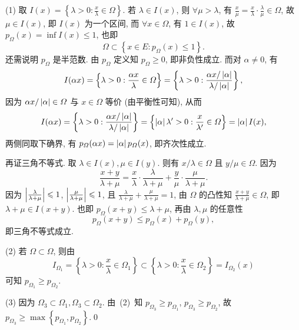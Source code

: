	\begin{Proof}
		(1) 取 $ I(x)=\left\{ \lambda>0 : \frac{x}{\lambda}\in\varOmega \right\} $. 若 $ \lambda\in I(x) $, 则 $ \forall \mu>\lambda $, 有 $ \frac{x}{\mu}=\frac{x}{\lambda}\cdot\frac{\lambda}{\mu}\in\varOmega $, 故 $ \mu\in I(x) $, 即 $ I(x) $ 为一个区间, 而 $ \forall x\in\varOmega $, 有 $ 1\in I(x) $, 故 $ p_{\varOmega}(x)=\inf I(x)\leqslant1 $, 也即
		\[
			\varOmega\subset\left\{ x\in E : p_{\varOmega}(x)\leqslant1 \right\}.
		\]
		还需说明 $ p_{\varOmega} $ 是半范数. 由 $ p_{\varOmega} $ 定义知 $ p_{\varOmega}\geqslant0 $, 即非负性成立. 而对 $ \alpha\ne 0 $, 有
		\[
			I(\alpha x)=\left\{ \lambda>0 : \frac{\alpha x}{\lambda}\in \varOmega \right\}=\left\{ \lambda>0 : \frac{\alpha x/\left| \alpha \right| }{\lambda/\left| \alpha \right| } \right\},
		\]
		因为 $ \alpha x/\left| \alpha \right| \in \varOmega $ 与 $ x\in\varOmega $ 等价 (由平衡性可知), 从而
		\[
			I(\alpha x)=\left\{ \lambda>0 : \frac{\alpha x/\left| \alpha \right| }{\lambda/\left| \alpha \right| } \right\}=\left\{ \left| \alpha \right| \lambda'>0 : \frac{x}{\lambda'}\in\varOmega \right\} = \left| \alpha \right|  I(x),
		\]
		两侧同取下确界, 有 $ p_{\varOmega}(\alpha x)=\left| \alpha \right| p_{\varOmega}(x) $, 即齐次性成立.

		再证三角不等式. 取 $ \lambda\in I(x), \mu\in I(y) $. 则有 $ x/\lambda\in\varOmega $ 且 $ y/\mu\in\varOmega $. 因为
		\[
			\frac{x+y}{\lambda+\mu} = \frac{x}{\lambda}\cdot\frac{\lambda}{\lambda+\mu}+\frac{y}{\mu}\cdot\frac{\mu}{\lambda+\mu}.
		\]
		因为 $ \left| \frac{\lambda}{\lambda+\mu} \right| \leqslant1 $, $ \left| \frac{\mu}{\lambda+\mu} \right| \leqslant1 $, 且 $ \frac{\lambda}{\lambda+\mu}+\frac{\mu}{\lambda+\mu}=1 $, 由 $ \varOmega $ 的凸性知 $ \frac{x+y}{\lambda+\mu}\in\varOmega $, 即 $ \lambda+\mu\in I(x+y) $. 也即 $ p_{\varOmega}(x+y)\leqslant\lambda+\mu $, 再由 $ \lambda, \mu $ 的任意性
		\[
			p_{\varOmega}(x+y)\leqslant p_{\varOmega}(x)+p_{\varOmega}(y),
		\]
		即三角不等式成立.

		(2) 若 $ \varOmega\subset\varOmega $, 则由
		\[
			I_{\varOmega_{1}}=\left\{ \lambda>0:\frac{x}{\lambda}\in\varOmega_{1} \right\}\subset\left\{ \lambda>0:\frac{x}{\lambda}\in\varOmega_{2} \right\} = I_{\varOmega_{2}}(x)
		\]
		可知 $ p_{\varOmega_{1}}\geqslant p_{\varOmega_{2}} $. 

		(3) 因为 $ \varOmega_{3}\subset\varOmega_{1}, \varOmega_{3}\subset\varOmega_{2} $. 由~(2)~知 $ p_{\varOmega_{3}}\geqslant p_{\varOmega_{1}} $, $ p_{\varOmega_{3}}\geqslant p_{\varOmega_{2}} $, 故 $ p_{\varOmega_{3}}\geqslant\max\left\{ p_{\varOmega_{1}}, p_{\varOmega_{2}} \right\} $.\qed
	\end{Proof}

